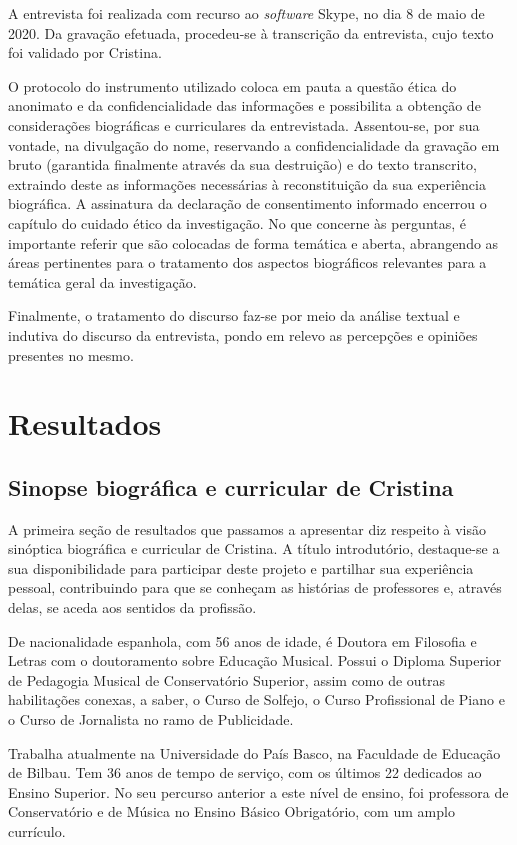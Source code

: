 \documentclass{textolivre}
\begin{document}
A entrevista foi realizada com recurso ao \textit{software} Skype, no dia 8 de maio de
2020. Da gravação efetuada, procedeu-se à transcrição da entrevista, cujo texto
foi validado por Cristina.

O protocolo do instrumento utilizado coloca em pauta a questão ética do
anonimato e da confidencialidade das informações e possibilita a obtenção de
considerações biográficas e curriculares da entrevistada. Assentou-se, por sua
vontade, na divulgação do nome, reservando a confidencialidade da gravação em
bruto (garantida finalmente através da sua destruição) e do texto transcrito,
extraindo deste as informações necessárias à reconstituição da sua experiência
biográfica. A assinatura da declaração de consentimento informado encerrou o
capítulo do cuidado ético da investigação. No que concerne às perguntas, é
importante referir que são colocadas de forma temática e aberta, abrangendo as
áreas pertinentes para o tratamento dos aspectos biográficos relevantes para a
temática geral da investigação.

Finalmente, o tratamento do discurso faz-se por meio da análise textual e
indutiva do discurso da entrevista, pondo em relevo as percepções e opiniões
presentes no mesmo.


\section{Resultados}\label{sec-resultados}
\subsection{Sinopse biográfica e curricular de Cristina}\label{sec-sinopse}
A primeira seção de resultados que passamos a apresentar diz respeito à visão
sinóptica biográfica e curricular de Cristina. A título introdutório,
destaque-se a sua disponibilidade para participar deste projeto e partilhar sua
experiência pessoal, contribuindo para que se conheçam as histórias de
professores e, através delas, se aceda aos sentidos da profissão.

De nacionalidade espanhola, com 56 anos de idade, é Doutora em Filosofia e
Letras com o doutoramento sobre Educação Musical. Possui o Diploma Superior de
Pedagogia Musical de Conservatório Superior, assim como de outras habilitações
conexas, a saber, o Curso de Solfejo, o Curso Profissional de Piano e o Curso
de Jornalista no ramo de Publicidade.

Trabalha atualmente na Universidade do País Basco, na Faculdade de Educação de
Bilbau. Tem 36 anos de tempo de serviço, com os últimos 22 dedicados ao Ensino
Superior. No seu percurso anterior a este nível de ensino, foi professora de
Conservatório e de Música no Ensino Básico Obrigatório, com um amplo currículo.
\end{document}

